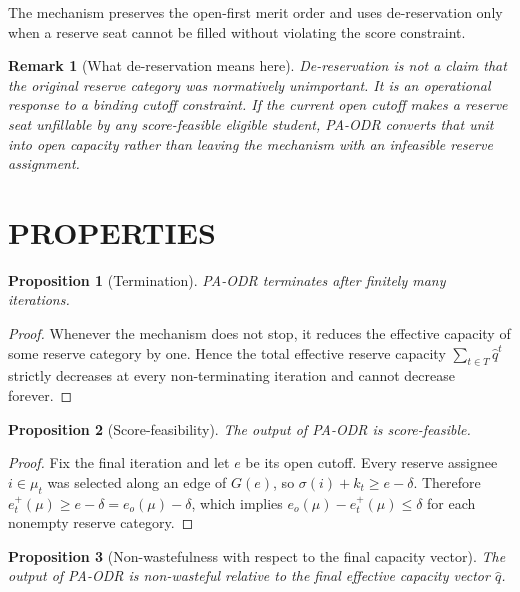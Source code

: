 \documentclass[a4paper,twoside]{article}
\newtheorem{proposition}{Proposition}
\newtheorem{remark}{Remark}
\begin{document}
The mechanism preserves the open-first merit order and uses de-reservation only when a reserve seat cannot be filled without violating the score constraint.

\begin{remark}[What de-reservation means here]
De-reservation is not a claim that the original reserve category was normatively unimportant. It is an operational response to a binding cutoff constraint. If the current open cutoff makes a reserve seat unfillable by any score-feasible eligible student, PA-ODR converts that unit into open capacity rather than leaving the mechanism with an infeasible reserve assignment.
\end{remark}

\section{\uppercase{Properties}}

\begin{proposition}[Termination]
\label{prop:paodr-termination-short}
PA-ODR terminates after finitely many iterations.
\end{proposition}

\begin{proof}
Whenever the mechanism does not stop, it reduces the effective capacity of some reserve category by one. Hence the total effective reserve capacity $\sum_{t\in T}\hat q^t$ strictly decreases at every non-terminating iteration and cannot decrease forever.
\end{proof}

\begin{proposition}[Score-feasibility]
\label{prop:paodr-score-short}
The output of PA-ODR is score-feasible.
\end{proposition}

\begin{proof}
Fix the final iteration and let $e$ be its open cutoff. Every reserve assignee $i\in\mu_t$ was selected along an edge of $G(e)$, so $\sigma(i)+k_t\ge e-\delta$. Therefore $e_t^+(\mu)\ge e-\delta=e_o(\mu)-\delta$, which implies $e_o(\mu)-e_t^+(\mu)\le \delta$ for each nonempty reserve category.
\end{proof}

\begin{proposition}[Non-wastefulness with respect to the final capacity vector]
\label{prop:paodr-nonwaste-short}
The output of PA-ODR is non-wasteful relative to the final effective capacity vector $\hat q$.
\end{proposition}
\end{document}
